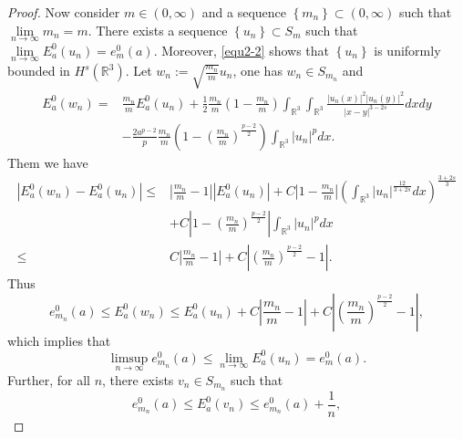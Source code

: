 \documentclass[reqno, 11pt]{amsart} %
\numberwithin{equation}{section}
\begin{document}
\begin{proof}
		Now consider $m\in (0, \infty)$ and a sequence $\left\lbrace m_{n}\right\rbrace \subset\left( 0, \infty\right)$ such that $\lim\limits_{n\rightarrow\infty}m_{n}=m$. There exists a sequence $\left\lbrace u_{n} \right\rbrace \subset S_{m}$ such that $\lim\limits_{n\rightarrow\infty}E^{0}_{a}(u_{n})=e^{0}_{m}(a)$. Moreover, \eqref{equ2-2} shows that $\left\lbrace u_{n}\right\rbrace $ is uniformly bounded in $H^{s}(\mathbb{R}^{3})$. Let $w_{n}:=\sqrt{\frac{m_{n}}{m}}u_{n}$, one has $w_{n}\in S_{m_{n}}$ and
		\begin{equation*}
			\begin{split}
				E^{0}_{a}(w_{n})=&\frac{m_{n}}{m}E^{0}_{a}(u_{n})+\frac{1}{2}\frac{m_{n}}{m}\left( 1-\frac{m_{n}}{m}\right) \int_{\mathbb{R}^{3}}\int_{\mathbb{R}^{3}}\frac{|u_{n}(x)|^{2}|u_{n}(y)|^{2}}{|x-y|^{3-2s}}dxdy\\
				&-\frac{2a^{p-2}}{p}\frac{m_{n}}{m}\left( 1-\left( \frac{m_{n}}{m}\right) ^{\frac{p-2}{2}}\right)\int_{\mathbb{R}^{3}}|u_{n}|^{p}dx.
			\end{split}
		\end{equation*} 
		Them we have
		\begin{equation}\label{equ2-3}
			\begin{split}
				\left| E^{0}_{a}(w_{n})-E^{0}_{a}(u_{n})\right| \leq&\left| \frac{m_{n}}{m}-1\right| \left| E^{0}_{a}(u_{n})\right| +C\left|1- \frac{m_{n}}{m}\right|\left(\int_{\mathbb{R}^{3}}|u_{n}|^{\frac{12}{3+2s}}dx\right)^{\frac{3+2s}{3}}\\
				&+C\left|  1-\left( \frac{m_{n}}{m}\right) ^{\frac{p-2}{2}}\right| \int_{\mathbb{R}^{3}}|u_{n}|^{p}dx\\
				\leq&C\left| \frac{m_{n}}{m}-1\right|+C\left| \left( \frac{m_{n}}{m}\right) ^{\frac{p-2}{2}}-1\right|.
			\end{split}
		\end{equation}
		Thus
		\begin{equation}\label{equ2-4}
			e^{0}_{m_{n}}(a)\leq E^{0}_{a}(w_{n})\leq E^{0}_{a}(u_{n})+C\left| \frac{m_{n}}{m}-1\right|+C\left| \left( \frac{m_{n}}{m}\right) ^{\frac{p-2}{2}}-1\right|,
		\end{equation}
		which implies that
		\begin{equation}\label{equ2-5}
			\limsup_{n\rightarrow\infty}e^{0}_{m_{n}}(a)\leq\lim_{n\rightarrow\infty}E^{0}_{a}(u_{n})=e^{0}_{m}(a).
		\end{equation} 
		Further, for all $n$, there exists $v_{n}\in S_{m_{n}}$ such that
		\begin{equation*}
			e^{0}_{m_{n}}(a)\leq E^{0}_{a}(v_{n})\leq e^{0}_{m_{n}}(a)+\frac{1}{n},

\end{equation*}
\end{proof}
\end{document}

